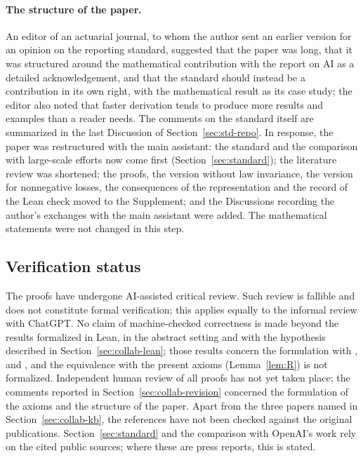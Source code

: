 \paragraph{The structure of the paper.}
An editor of an actuarial journal, to whom the author sent an earlier version for an opinion on the reporting
standard, suggested that the paper was long, that it was structured around the mathematical contribution with the
report on AI as a detailed acknowledgement, and that the standard should instead be a contribution in its own right,
with the mathematical result as its case study; the editor also noted that faster derivation tends to produce more
results and examples than a reader needs. The comments on the standard itself are summarized in the last Discussion
of Section~\ref{sec:std-repo}. In response, the paper was restructured with the main assistant: the standard and the
comparison with large-scale efforts now come first (Section~\ref{sec:standard}); the literature review was
shortened; the proofs, the version without law invariance, the version for nonnegative losses, the consequences of
the representation and the record of the Lean check moved to the Supplement; and the Discussions recording the
author's exchanges with the main assistant were added. The mathematical statements were not changed in this step.

\subsection{Verification status}\label{sec:collab-status}

The proofs have undergone AI-assisted critical review. Such review is fallible and does not constitute formal
verification; this applies equally to the informal review with ChatGPT. No claim of machine-checked correctness is
made beyond the results formalized in Lean, in the abstract setting and with the hypothesis described in
Section~\ref{sec:collab-lean}; those results concern the formulation with \axP, \axN{} and \axCM, and the
equivalence with the present axioms (Lemma~\ref{lem:R}) is not formalized. Independent human review of all proofs
has not yet taken place; the comments reported in Section~\ref{sec:collab-revision} concerned the formulation of
the axioms and the structure of the paper. Apart from the three papers named in Section~\ref{sec:collab-kb}, the
references have not been checked against the original publications. Section~\ref{sec:standard} and the
comparison with OpenAI's work rely on the cited public sources; where these are press reports, this is stated.
